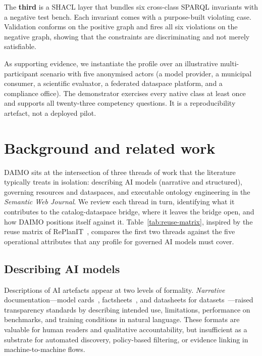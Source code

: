 \documentclass[Afour,sagev,times]{sagej}
\begin{document}
The \textbf{third} is a SHACL layer that bundles six cross-class SPARQL invariants with a negative test bench. Each invariant comes with a purpose-built violating case. Validation conforms on the positive graph and fires all six violations on the negative graph, showing that the constraints are discriminating and not merely satisfiable.

As supporting evidence, we instantiate the profile over an illustrative multi-participant scenario with five anonymised actors (a model provider, a municipal consumer, a scientific evaluator, a federated dataspace platform, and a compliance office). The demonstrator exercises every native class at least once and supports all twenty-three competency questions. It is a reproducibility artefact, not a deployed pilot.


\section{Background and related work}\label{sec:related}

DAIMO sits at the intersection of three threads of work that the literature typically treats in isolation: describing AI models (narrative and structured), governing resources and dataspaces, and executable ontology engineering in the \emph{Semantic Web Journal}. We review each thread in turn, identifying what it contributes to the catalog-dataspace bridge, where it leaves the bridge open, and how DAIMO positions itself against it. Table~\ref{tab:reuse-matrix}, inspired by the reuse matrix of RePlanIT~\cite{kurteva}, compares the first two threads against the five operational attributes that any profile for governed AI models must cover.

\subsection{Describing AI models}

Descriptions of AI artefacts appear at two levels of formality. \emph{Narrative} documentation---model cards~\cite{mitchell19}, factsheets~\cite{arnold19}, and datasheets for datasets~\cite{gebru21}---raised transparency standards by describing intended use, limitations, performance on benchmarks, and training conditions in natural language. These formats are valuable for human readers and qualitative accountability, but insufficient as a substrate for automated discovery, policy-based filtering, or evidence linking in machine-to-machine flows.
\end{document}
